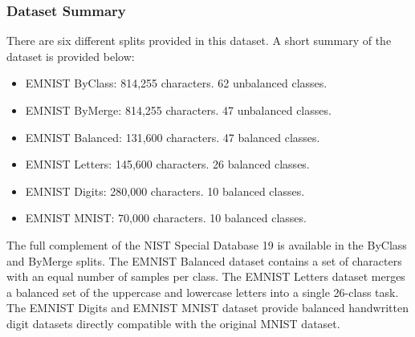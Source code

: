 \subsubsection{Dataset Summary}
There are six different splits provided in this dataset. A short summary of the dataset is provided below:
\begin{itemize}
  \item EMNIST ByClass: 814,255 characters. 62 unbalanced classes.
  \item EMNIST ByMerge: 814,255 characters. 47 unbalanced classes.
  \item EMNIST Balanced:  131,600 characters. 47 balanced classes.
  \item EMNIST Letters: 145,600 characters. 26 balanced classes.
  \item EMNIST Digits: 280,000 characters. 10 balanced classes.
  \item EMNIST MNIST: 70,000 characters. 10 balanced classes.
\end{itemize}
The full complement of the NIST Special Database 19 is available in the ByClass and ByMerge splits. The EMNIST Balanced dataset contains a set of characters with an equal number of samples per class.
The EMNIST Letters dataset merges a balanced set of the uppercase and lowercase letters into a single 26-class task. The EMNIST Digits and EMNIST MNIST dataset provide balanced handwritten digit datasets directly compatible with the original MNIST dataset.
